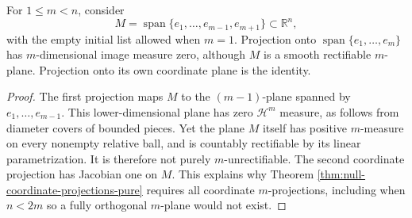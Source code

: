 \begin{example}\label{ex:one-null-projection-insufficient}
For $1\leq m<n$, consider
\[
 M=\operatorname{span}\{e_1,\ldots,e_{m-1},e_{m+1}\}\subset\mathbb R^n,
\]
with the empty initial list allowed when $m=1$. Projection onto $\operatorname{span}\{e_1,\ldots,e_m\}$ has $m$-dimensional image measure zero, although $M$ is a smooth rectifiable $m$-plane. Projection onto its own coordinate plane is the identity.
\end{example}
\begin{proof}
The first projection maps $M$ to the $(m-1)$-plane spanned by $e_1,\ldots,e_{m-1}$. This lower-dimensional plane has zero $\mathcal H^m$ measure, as follows from diameter covers of bounded pieces. Yet the plane $M$ itself has positive $m$-measure on every nonempty relative ball, and is countably rectifiable by its linear parametrization. It is therefore not purely $m$-unrectifiable. The second coordinate projection has Jacobian one on $M$. This explains why Theorem \ref{thm:null-coordinate-projections-pure} requires all coordinate $m$-projections, including when $n<2m$ so a fully orthogonal $m$-plane would not exist.
\end{proof}
